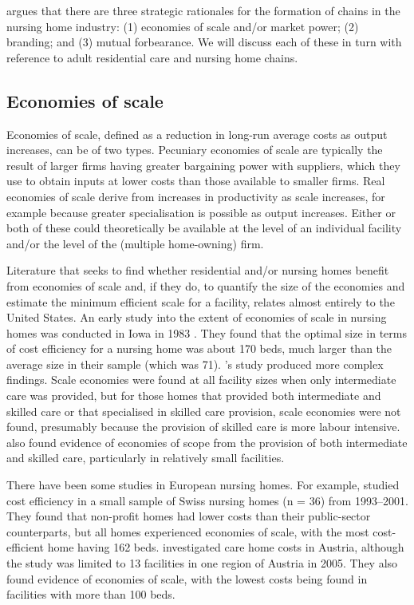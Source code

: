 \documentclass[a4paper,11pt,titlepage,british]{article}
\newcommand{\possessivecite}[1]{\citeauthor{#1}'s \citeyear{#1}}%
\begin{document}
\textcite{Baum1999} argues that there are three strategic rationales for the formation of chains in the nursing home industry: (1) economies of scale and/or market power; (2) branding; and (3) mutual forbearance.  We will discuss each of these in turn with reference to adult residential care and nursing home chains.

\subsection{Economies of scale}

Economies of scale, defined as a reduction in long-run average costs as output increases, can be of two types.  Pecuniary economies of scale are typically the result of larger firms having greater bargaining power with suppliers, which they use to obtain inputs at lower costs than those available to smaller firms.  Real economies of scale derive from increases in productivity as scale increases, for example because greater specialisation is possible as output increases. Either or both of these could theoretically be available at the level of an individual facility and/or the level of the (multiple home-owning) firm.

Literature that seeks to find whether residential and/or nursing homes benefit from economies of scale and, if they do, to quantify the size of the economies and estimate the minimum efficient scale for a facility, relates almost entirely to the United States.  An early study into the extent of economies of scale in nursing homes was conducted in Iowa in 1983 \parencite{Nyman1990}.  They found that the optimal size in terms of cost efficiency for a nursing home was about 170 beds, much larger than the average size in their sample (which was 71).  \possessivecite{Christensen2004} study produced more complex findings.  Scale economies were found at all facility sizes when only intermediate care was provided, but for those homes that provided both intermediate and skilled care or that specialised in skilled care provision, scale economies were not found, presumably because the provision of skilled care is more labour intensive.  \textcite{Christensen2004} also found evidence of economies of scope from the provision of both intermediate and skilled care, particularly in relatively small facilities.

There have been some studies in European nursing homes.  For example, \textcite{Farsi2004} studied cost efficiency in a small sample of Swiss nursing homes (n = 36) from 1993--2001.  They found that non-profit homes had lower costs than their public-sector counterparts, but all homes experienced economies of scale, with the most cost-efficient home having 162 beds.  \textcite{Hoess2009} investigated care home costs in Austria, although the study was limited to 13 facilities in one region of Austria in 2005.  They also found evidence of economies of scale, with the lowest costs being found in facilities with more than 100 beds.
\end{document}
